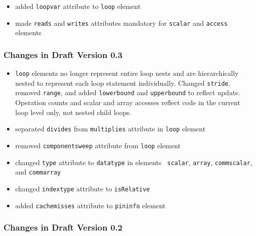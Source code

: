 \documentclass{article}
\begin{document}
\begin{itemize}
\item added {\tt loopvar} attribute to {\tt loop} element
\item made {\tt reads} and {\tt writes} attributes mandatory for
  {\tt scalar} and {\tt access} elements
\end{itemize}

\subsubsection{Changes in Draft Version 0.3}

\begin{itemize}
\item {\tt loop} elements no longer represent entire loop nests and are
  hierarchically nested to represent each loop statement individually.
  Changed {\tt stride}, removed {\tt range}, and added {\tt lowerbound}
  and {\tt upperbound} to reflect update.  Operation counts and scalar
  and array accesses reflect code in the current loop level only, not
  nested child loops.
\item separated {\tt divides} from {\tt multiplies} attribute in
  {\tt loop} element
\item removed {\tt componentsweep} attribute from {\tt loop} element
\item changed {\tt type} attribute to {\tt datatype} in elements {\tt
  scalar}, {\tt array}, {\tt commscalar}, and {\tt commarray}
\item changed {\tt indextype} attribute to {\tt isRelative}
\item added {\tt cachemisses} attribute to {\tt pininfo} element
\end{itemize}

\subsubsection{Changes in Draft Version 0.2}
\end{document}
